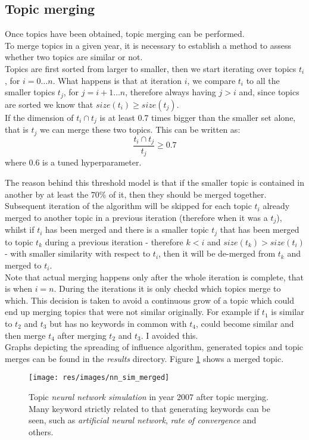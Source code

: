 \documentclass{article}
\begin{document}
\newpage

\subsection{Topic merging}
Once topics have been obtained, topic merging can be performed.\\
To merge topics in a given year, it is necessary to establish a method to assess whether two topics are similar or not.\\
Topics are first sorted from larger to smaller, then we start iterating over topics $t_i$, for $i=0\dots n$.
What happens is that at iteration $i$, we compare $t_i$ to all the smaller topics $t_j$, for $j=i+1\dots n$, therefore always having $j>i$ and, since topics are sorted we know that $size(t_i) \geq size(t_j)$.\\
If the dimension of $t_i \cap t_j$ is at least 0.7 times bigger than the smaller set alone, that is $t_j$ we can merge these two topics.
This can be written as:
\begin{equation}
	\frac{t_i \cap t_j}{t_j} \geq 0.7
\end{equation}
where $0.6$ is a tuned hyperparameter.

The reason behind this threshold model is that if the smaller topic is contained in another by at least the $70\%$ of it, then they should be merged together.\\
Subsequent iteration of the algorithm will be skipped for each topic $t_i$ already merged to another topic in a previous iteration (therefore when it was a $t_j$), whilst if $t_i$ has been merged and there is a smaller topic $t_j$ that has been merged to topic $t_k$ during a previous iteration - therefore $k<i$ and $size(t_k) > size(t_i)$ - with smaller similarity with respect to $t_i$, then it will be de-merged from $t_k$ and merged to $t_i$.\\
Note that actual merging happens only after the whole iteration is complete, that is when $i=n$. During the iterations it is only checkd which topics merge to which. This decision is taken to avoid a continuous grow of a topic which could end up merging topics that were not similar originally. For example if $t_1$ is similar to $t_2$ and $t_3$ but has no keywords in common with $t_4$, could become similar and then merge $t_4$ after merging $t_2$ and $t_3$. I avoided this.\\
Graphs depicting the spreading of influence algorithm, generated topics and topic merges can be found in the \textit{results} directory.
Figure \ref{nn_merged} shows a merged topic.
\begin{figure}[H]
\texttt{[image: res/images/nn\_sim\_merged]}
\centering
\caption{Topic \textit{neural network simulation} in year 2007 after topic merging. Many keyword strictly related to that generating keywords can be seen, such as \textit{artificial neural network}, \textit{rate of convergence} and others.}
\label{nn_merged}
\end{figure}
\end{document}
